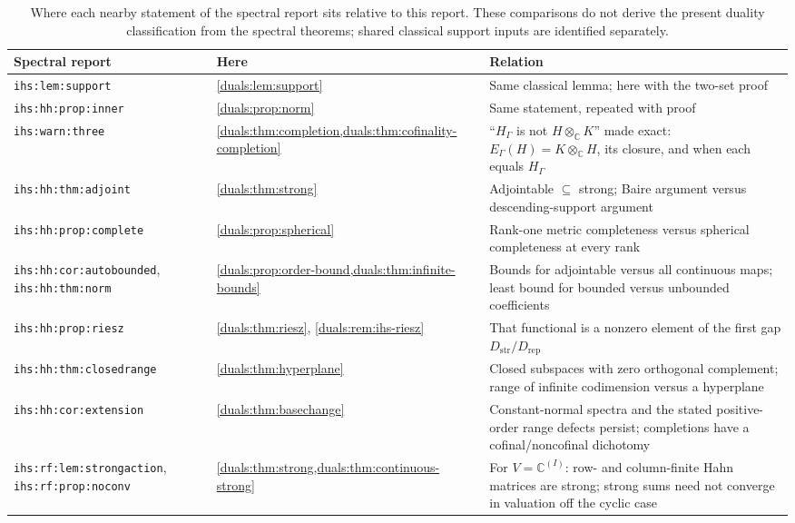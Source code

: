 \documentclass[11pt,letterpaper]{article}
\numberwithin{equation}{section}
\theoremstyle{definition}
\theoremstyle{remark}
\newcommand{\C}{\mathbb C}
\newcommand{\HG}{H_\Gamma}
\newcommand{\Dstr}{D_{\mathrm{str}}}
\newcommand{\Drep}{D_{\mathrm{rep}}}
\newcommand{\ihs}[1]{\texttt{ihs:#1}}
\begin{document}
\begin{table}[ht]
\centering\small
\begin{tabularx}{\textwidth}{@{}>{\raggedright\arraybackslash}p{}>{\raggedright\arraybackslash}p{}Y@{}}
\toprule
Spectral report & Here & Relation\\
\midrule
\ihs{lem:support} & \cref{duals:lem:support} & Same classical lemma; here with the two-set proof\\
\ihs{hh:prop:inner} & \cref{duals:prop:norm} & Same statement, repeated with proof\\
\ihs{warn:three} & \cref{duals:thm:completion,duals:thm:cofinality-completion} & ``$\HG$ is not $H\otimes_\C K$'' made exact: $E_\Gamma(H)=K\otimes_\C H$, its closure, and when each equals $\HG$\\
\ihs{hh:thm:adjoint} & \cref{duals:thm:strong} & Adjointable $\subseteq$ strong; Baire argument versus descending-support argument\\
\ihs{hh:prop:complete} & \cref{duals:prop:spherical} & Rank-one metric completeness versus spherical completeness at every rank\\
\ihs{hh:cor:autobounded}, \ihs{hh:thm:norm} & \cref{duals:prop:order-bound,duals:thm:infinite-bounds} & Bounds for adjointable versus all continuous maps; least bound for bounded versus unbounded coefficients\\
\ihs{hh:prop:riesz} & \cref{duals:thm:riesz}, \cref{duals:rem:ihs-riesz} & That functional is a nonzero element of the first gap $\Dstr/\Drep$\\
\ihs{hh:thm:closedrange} & \cref{duals:thm:hyperplane} & Closed subspaces with zero orthogonal complement; range of infinite codimension versus a hyperplane\\
\ihs{hh:cor:extension} & \cref{duals:thm:basechange} & Constant-normal spectra and the stated positive-order range defects persist; completions have a cofinal/noncofinal dichotomy\\
\ihs{rf:lem:strongaction}, \ihs{rf:prop:noconv} & \cref{duals:thm:strong,duals:thm:continuous-strong} & For $V=\C^{(I)}$: row- and column-finite Hahn matrices are strong; strong sums need not converge in valuation off the cyclic case\\
\bottomrule
\end{tabularx}
\caption{Where each nearby statement of the spectral report sits relative
to this report. These comparisons do not derive the present duality
classification from the spectral theorems; shared classical support
inputs are identified separately.}
\label{duals:tab:ihs}
\end{table}
\end{document}
